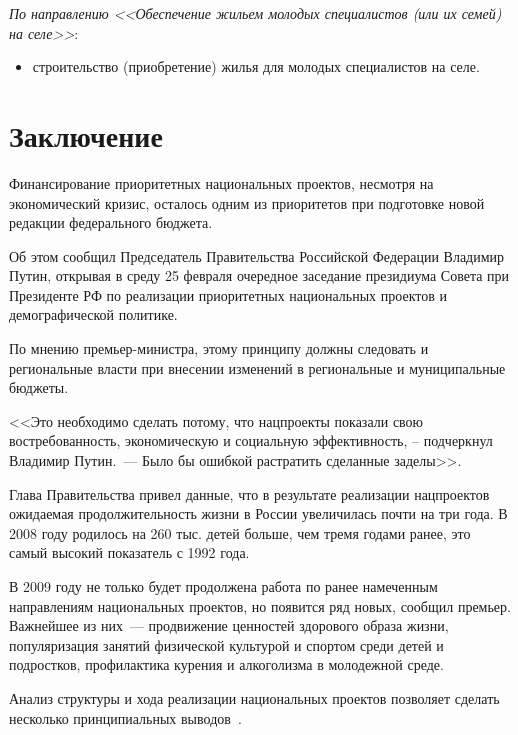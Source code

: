 \documentclass[article, 12pt, russian, oneside]{ncc}
\begin{document}
\emph{По направлению <<Обеспечение жильем молодых специалистов (или их
  семей) на селе>>}:

\begin{itemize}
\item строительство (приобретение) жилья для молодых специалистов на
  селе.
\end{itemize}
\newpage

\noheadingtag
\section{Заключение}

Финансирование приоритетных национальных проектов, несмотря на
экономический кризис, осталось одним из приоритетов при подготовке
новой редакции федерального бюджета.

Об этом сообщил Председатель Правительства Российской Федерации
Владимир Путин, открывая в среду 25 февраля очередное заседание
президиума Совета при Президенте РФ по реализации приоритетных
национальных проектов и демографической политике.

По мнению премьер-министра, этому принципу должны следовать и
региональные власти при внесении изменений в региональные и
муниципальные бюджеты.

<<Это необходимо сделать потому, что нацпроекты показали свою
востребованность, экономическую и социальную эффективность, –
подчеркнул Владимир Путин.~--- Было бы ошибкой растратить сделанные
заделы>>.

Глава Правительства привел данные, что в результате реализации
нацпроектов ожидаемая продолжительность жизни в России увеличилась
почти на три года. В 2008 году родилось на 260 тыс. детей больше, чем
тремя годами ранее, это самый высокий показатель с 1992 года.

В 2009 году не только будет продолжена работа по ранее намеченным
направлениям национальных проектов, но появится ряд новых, сообщил
премьер. Важнейшее из них~--- продвижение ценностей здорового образа
жизни, популяризация занятий физической культурой и спортом среди
детей и подростков, профилактика курения и алкоголизма в молодежной
среде.

Анализ структуры и хода реализации национальных проектов позволяет
сделать несколько принципиальных выводов~\cite{Spero}.
\end{document}
